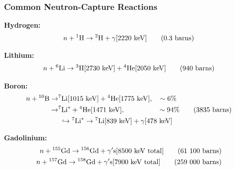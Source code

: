 \documentclass[table]{beamer}
\begin{document}
\begin{frame}
  \frametitle{Common Neutron-Capture Reactions}

  \textbf{Hydrogen:}
  \begin{equation}
    n + \nucl{1}{H} \to \nucl{2}{H} + \gamma [ 2220~\mathrm{keV} ] \tag{0.3~barns} %
  \end{equation}

  \textbf{Lithium:}
  \begin{equation}
    n + {}^{6}\mbox{Li} \to {}^{3}\mbox{H} [2730~\mathrm{keV}] + {}^{4}\mbox{He} [2050~\mathrm{keV}] \tag{940~barns}
  \end{equation}

  \textbf{Boron:}
  \begin{equation}
    \begin{split}
      n + \nucl{10}{B} \to & \nucl{7}{Li} [1015~\mathrm{keV}] + \nucl{4}{He} [1775~\mathrm{keV}], \quad \sim 6 \% \\%
	\to & \nucl{7}{Li}^* + \nucl{4}{He} [1471~\mathrm{keV}], \qquad \qquad \quad \sim 94 \% \\
  	    & \; \hookrightarrow \nucl{7}{Li}^* \to \nucl{7}{Li} [839~\mathrm{keV}] + \gamma [478~\mathrm{keV}]
    \end{split} \tag{3835~barns}
  \end{equation}

  \textbf{Gadolinium:}
  \begin{align*}
    n + {}^{155}\mbox{Gd} \to {}^{156}\mbox{Gd} + \gamma\mathrm{'s} [8500~\mathrm{keV~total}] \tag{61~100~barns} \\
    n + {}^{157}\mbox{Gd} \to {}^{158}\mbox{Gd} + \gamma\mathrm{'s} [7900~\mathrm{keV~total}] \tag{259~000~barns}
  \end{align*}

\end{frame}


\end{document}
